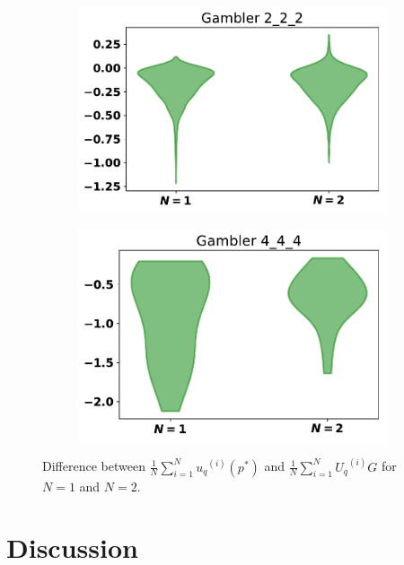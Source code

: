 \documentclass[10pt]{article}
\begin{document}
\begin{figure}
\begin{subfigure}{0.30\textwidth}
    \end{subfigure}
    \begin{subfigure}{0.30\textwidth}
        \centering
        \includegraphics[width=\textwidth]{"img/Gambler 2_2_2_boxplot"}
    \end{subfigure}
    \begin{subfigure}{0.30\textwidth}
        \centering
        \includegraphics[width=\textwidth]{"img/Gambler 4_4_4_boxplot"}
    \end{subfigure}
    \caption{Difference between \(\frac{1}{N} \sum\limits_{i=1} ^ {N} {u_q}^{(i)} (p ^ *)\)
    and  \(\frac{1}{N} \sum\limits_{i=1} ^ {N} {U_q}^{(i)} G\) for \(N=1\) and \(N=2\).}
    \label{fig:boxplots}
\end{figure}


\section{Discussion}
\end{document}
